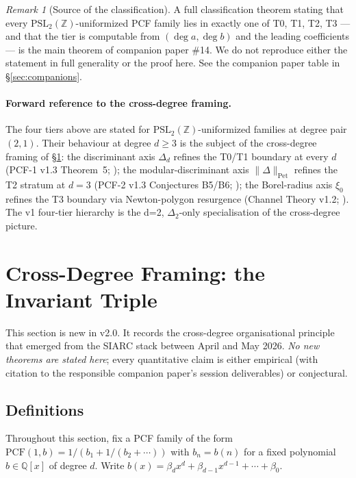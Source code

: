 \documentclass[11pt,a4paper]{article}
\theoremstyle{definition}
\theoremstyle{remark}
\newtheorem{remark}[conjecture]{Remark}
\newcommand{\PSLZ}{\mathrm{PSL}_2(\mathbb{Z})}
\newcommand{\PCF}{\mathrm{PCF}}
\newcommand{\Q}{\mathbb{Q}}
\newcommand{\PetN}[1]{\lVert #1 \rVert_{\mathrm{Pet}}}
\begin{document}
\begin{remark}[Source of the classification]
\label{rem:tiers-source}
A full classification theorem stating that every $\PSLZ$-uniformized
PCF family lies in exactly one of T0, T1, T2, T3 --- and that the
tier is computable from $(\deg a, \deg b)$ and the leading coefficients
--- is the main theorem of companion paper \#14. We do not reproduce
either the statement in full generality or the proof here. See the
companion paper table in \S\ref{sec:companions}.
\end{remark}

\paragraph{Forward reference to the cross-degree framing.}
\label{par:forward-ref-triple}
The four tiers above are stated for $\PSLZ$-uniformized families at
degree pair $(2,1)$. Their behaviour at degree $d \geq 3$ is the subject
of the cross-degree framing of \S\ref{sec:triple}: the discriminant axis
$\Delta_d$ refines the T0/T1 boundary at every $d$ (PCF-1 v1.3
Theorem~5; \cite{PCF1}); the modular-discriminant axis $\PetN{\Delta}$
refines the T2 stratum at $d=3$ (PCF-2 v1.3 Conjectures B5/B6;
\cite{PCF2}); the Borel-radius axis $\xi_0$ refines the T3 boundary
via Newton-polygon resurgence (Channel Theory v1.2; \cite{CT}). The
v1 four-tier hierarchy is the d=2, $\Delta_2$-only specialisation of
the cross-degree picture.

\section{Cross-Degree Framing: the Invariant Triple}
\label{sec:triple}

This section is new in v2.0. It records the cross-degree
organisational principle that emerged from the SIARC stack between
April and May 2026. \emph{No new theorems are stated here}; every
quantitative claim is either empirical (with citation to the responsible
companion paper's session deliverables) or conjectural.

\subsection{Definitions}
\label{sec:triple-defs}

Throughout this section, fix a PCF family of the form
$\PCF(1, b) = 1/(b_1 + 1/(b_2 + \cdots))$ with $b_n = b(n)$ for a fixed
polynomial $b \in \Q[x]$ of degree $d$. Write
$b(x) = \beta_d x^d + \beta_{d-1} x^{d-1} + \cdots + \beta_0$.
\end{document}

